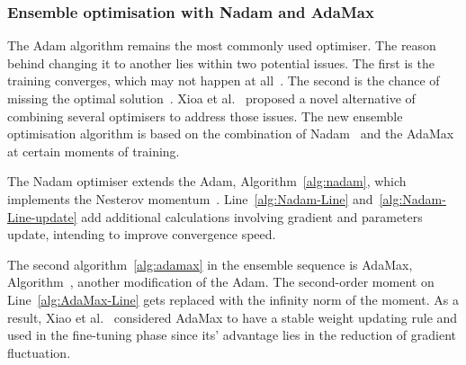 \subsubsection{Ensemble optimisation with Nadam and AdaMax}
The Adam algorithm remains the most commonly used optimiser.
The reason behind changing it to another lies within two potential issues.
The first is the training converges, which may not happen at all~\cite{reddi_convergence_2019}.
The second is the chance of missing the optimal solution~\cite{wilson_marginal_2017}.
Xioa et al.~\cite{xiao_accurate_2019} proposed a novel alternative of combining several optimisers to address those issues.
The new ensemble optimisation algorithm is based on the combination of Nadam~\cite{dozat_nadam_2016} and the AdaMax~\cite{kingma_adam_2017} at certain moments of training.

%
%
The Nadam optimiser extends the Adam, Algorithm~\ref{alg:nadam}, which implements the Nesterov momentum~\cite{dozat_nadam_2016}.
Line~\ref{alg:Nadam-Line} and~\ref{alg:Nadam-Line-update} add additional calculations involving gradient and parameters update, intending to improve convergence speed.

%
%
The second algorithm~\ref{alg:adamax} in the ensemble sequence is AdaMax, Algorithm~\cite{kingma_adam_2017}, another modification of the Adam.
The second-order moment on Line~\ref{alg:AdaMax-Line} gets replaced with the infinity norm of the moment.
As a result, Xiao et al.~\cite{xiao_accurate_2019} considered AdaMax to have a stable weight updating rule and used in the fine-tuning phase since its' advantage lies in the reduction of gradient fluctuation. 

